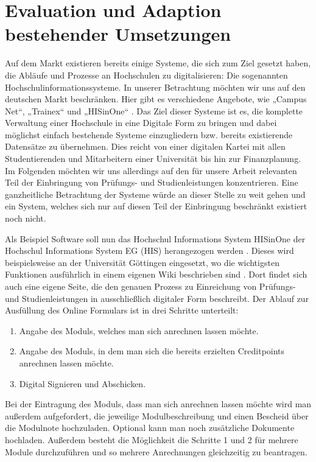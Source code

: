\section{Evaluation und Adaption bestehender Umsetzungen}

Auf dem Markt existieren bereits einige Systeme, die sich zum Ziel gesetzt haben, die Abläufe und Prozesse an Hochschulen zu digitalisieren: Die sogenannten Hochschulinformationssysteme. In unserer Betrachtung möchten wir uns auf den deutschen Markt beschränken. Hier gibt es verschiedene Angebote, wie „Campus Net“, „Trainex“ und „HISinOne“ \parencite{wiki_his}. Das Ziel dieser Systeme ist es, die komplette Verwaltung einer Hochschule in eine Digitale Form zu bringen und dabei möglichst einfach bestehende Systeme einzugliedern bzw. bereits existierende Datensätze zu übernehmen. Dies reicht von einer digitalen Kartei mit allen Studentierenden und Mitarbeitern einer Universität bis hin zur Finanzplanung. Im Folgenden möchten wir uns allerdings auf den für unsere Arbeit relevanten Teil der Einbringung von Prüfungs- und Studienleistungen konzentrieren. Eine ganzheitliche Betrachtung der Systeme würde an dieser Stelle zu weit gehen und ein System, welches sich nur auf diesen Teil der Einbringung beschränkt existiert noch nicht.

Als Beispiel Software soll nun das Hochschul Informations System HISinOne der Hochschul Informations System EG (HIS) herangezogen werden \parencite{hisde}. Dieses wird beispielsweise an der Universität Göttingen eingesetzt, wo die wichtigsten Funktionen ausführlich in einem eigenen Wiki beschrieben sind \parencite{studit}. Dort findet sich auch eine eigene Seite, die den genauen Prozess zu Einreichung von Prüfungs- und Studienleistungen in ausschließlich digitaler Form beschreibt. Der Ablauf zur Ausfüllung des Online Formulars ist in drei Schritte unterteilt:
\begin{enumerate}
\item Angabe des Moduls, welches man sich anrechnen lassen möchte.
\item Angabe des Moduls, in dem man sich die bereits erzielten Creditpoints anrechnen lassen möchte.
\item Digital Signieren und Abschicken.
\end{enumerate}

Bei der Eintragung des Moduls, dass man sich anrechnen lassen möchte wird man außerdem aufgefordert, die jeweilige Modulbeschreibung und einen Bescheid über die Modulnote hochzuladen. Optional kann man noch zusätzliche Dokumente hochladen. Außerdem besteht die Möglichkeit die Schritte 1 und 2 für mehrere Module durchzuführen und so mehrere Anrechnungen gleichzeitig zu beantragen.

